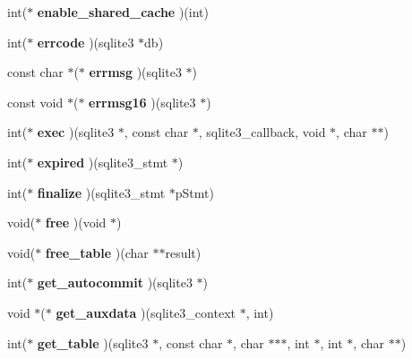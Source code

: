\begin{CompactItemize}
\item 
int($\ast$ \textbf{enable\_\-shared\_\-cache} )(int)\label{structsqlite3__api__routines_c1237ed9fc4243e26bad6a1b6dde1e35}

\item 
int($\ast$ \textbf{errcode} )(sqlite3 $\ast$db)\label{structsqlite3__api__routines_dc08ede03018a2d35a3d8d8c60fbcf9d}

\item 
const char $\ast$($\ast$ \textbf{errmsg} )(sqlite3 $\ast$)\label{structsqlite3__api__routines_0e9fafd41411b21d65433baa08841336}

\item 
const void $\ast$($\ast$ \textbf{errmsg16} )(sqlite3 $\ast$)\label{structsqlite3__api__routines_f3b33f0643951c198db3decd57c8106d}

\item 
int($\ast$ \textbf{exec} )(sqlite3 $\ast$, const char $\ast$, sqlite3\_\-callback, void $\ast$, char $\ast$$\ast$)\label{structsqlite3__api__routines_e0659d13c53d1a695cec5fccaca76b9c}

\item 
int($\ast$ \textbf{expired} )(sqlite3\_\-stmt $\ast$)\label{structsqlite3__api__routines_3b7bdc1ea9eee2b52d8a082d252e1829}

\item 
int($\ast$ \textbf{finalize} )(sqlite3\_\-stmt $\ast$pStmt)\label{structsqlite3__api__routines_d5418cddfc1a9bf90af588a894ddb594}

\item 
void($\ast$ \textbf{free} )(void $\ast$)\label{structsqlite3__api__routines_b11e308af4d13f0e0e4bd2c66dd5c1a0}

\item 
void($\ast$ \textbf{free\_\-table} )(char $\ast$$\ast$result)\label{structsqlite3__api__routines_4339b8200f8cade769773cd0e41225ac}

\item 
int($\ast$ \textbf{get\_\-autocommit} )(sqlite3 $\ast$)\label{structsqlite3__api__routines_3bba0c59be3759e884be9f1651c86eef}

\item 
void $\ast$($\ast$ \textbf{get\_\-auxdata} )(sqlite3\_\-context $\ast$, int)\label{structsqlite3__api__routines_26978c033bf9e8132f5a2a5e84f2f922}

\item 
int($\ast$ \textbf{get\_\-table} )(sqlite3 $\ast$, const char $\ast$, char $\ast$$\ast$$\ast$, int $\ast$, int $\ast$, char $\ast$$\ast$)\label{structsqlite3__api__routines_26519b89594fca7ab6970dd5b92b8038}


\end{CompactItemize}
